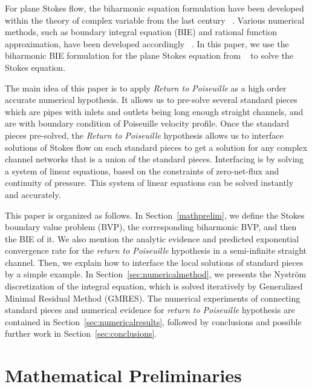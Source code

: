 \documentclass[10pt,twocolumn,letterpaper]{article}
\begin{document}
For plane Stokes flow, 
the biharmonic equation formulation have been developed 
within the theory of complex variable from the last century
~\cite{ladyzhenskayaMathematicalTheoryViscous1964}. 
Various numerical methods,
such as boundary integral equation (BIE) and rational function approximation,
have been developed accordingly
~\cite{greengardIntegralEquationMethods1996,trefethenApproximationTheoryApproximation2019}.
In this paper, we use the biharmonic BIE formulation for the plane Stokes
equation from
~\cite{greengardIntegralEquationMethods1996}
to solve the Stokes equation. 


The main idea of this paper is to apply \textit{Return to Poiseuille} as a high
order accurate numerical hypothesis. 
It allows us to pre-solve several standard pieces 
which are pipes with inlets and outlets being long enough straight channels, 
and are with boundary condition of Poiseuille velocity profile. 
Once the standard pieces pre-solved, 
the \textit{Return to Poiseuille} hypothesis allows us to 
interface solutions of Stokes flow on each standard pieces 
to get a solution for  any complex channel networks 
that is a union of the standard pieces. 
Interfacing is by solving a system of linear equations, 
based on the constraints of zero-net-flux and continuity of pressure. 
This system of linear equations can be solved instantly and accurately.

This paper is organized as follows. In Section~\ref{mathprelim}, we define the
Stokes boundary value problem (BVP), the corresponding biharmonic BVP, and then the BIE of it. 
We also mention the analytic evidence and predicted exponential convergence rate for 
the \textit{return to Poiseuille} hypothesis 
in a semi-infinite straight channel. 
Then, we explain how to interface the local solutions of standard pieces 
by a simple example. 
In Section~\ref{sec:numericalmethod}, 
we presents the Nystr\"om discretization of the integral equation, 
which is solved iteratively by Generalized Minimal Residual Method (GMRES).
The numerical experiments of connecting standard pieces and numerical evidence
for \textit{return to Poiseuille} hypothesis are contained in Section~\ref{sec:numericalresults}, 
followed by conclusions and possible further work
in Section~\ref{sec:conclusions}.

\section{Mathematical Preliminaries\label{mathprelim}}
\end{document}
